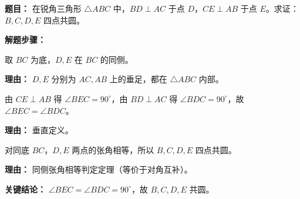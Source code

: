 \begin{examplebox}
	\textbf{\textcolor{CExample}{题目：}}
	在锐角三角形 $\triangle ABC$ 中，$BD \perp AC$ 于点 $D$，$CE \perp AB$ 于点 $E$。求证：$B,C,D,E$ 四点共圆。

	\textbf{\textcolor{CExample}{解题步骤：}}
	\begin{description}[style=nextline, leftmargin=2.8em, labelsep=0.5em, itemsep=0.45em]
		\item[\textbf{第一步（确定同底）：}]
			取 $BC$ 为底，$D,E$ 在 $BC$ 的同侧。
			\par\textbf{理由：} $D,E$ 分别为 $AC,AB$ 上的垂足，都在 $\triangle ABC$ 内部。
		\item[\textbf{第二步（张角相等）：}]
			由 $CE\perp AB$ 得 $\angle BEC = 90^\circ$，由 $BD\perp AC$ 得 $\angle BDC = 90^\circ$，故 $\angle BEC = \angle BDC$。
			\par\textbf{理由：} 垂直定义。
		\item[\textbf{第三步（判定共圆）：}]
			对同底 $BC$，$D,E$ 两点的张角相等，所以 $B,C,D,E$ 四点共圆。
			\par\textbf{理由：} 同侧张角相等判定定理（等价于对角互补）。
	\end{description}

	\textbf{\textcolor{CExample}{关键结论：}}
	$\angle BEC=\angle BDC=90^\circ$，故 $B,C,D,E$ 共圆。
\end{examplebox}
